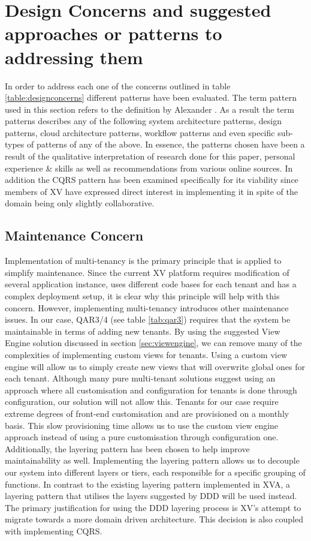 \section{Design Concerns and suggested approaches or patterns to addressing them}
In order to address each one of the concerns outlined in table \ref{table:designconcerns} different patterns have been evaluated. The term pattern used in this section refers to the definition by Alexander \cite{Alexander1977-ni}. As a result the term patterns describes any of the following system architecture patterns, design patterns, cloud architecture patterns, workflow patterns and even specific sub-types of patterns of any of the above. In essence, the patterns chosen have been a result of the qualitative interpretation of research done for this paper, personal experience \& skills as well as recommendations from various online sources. In addition the CQRS pattern has been examined specifically for its viability since members of XV have expressed direct interest in implementing it in spite of the domain being only slightly collaborative. 

\subsection{Maintenance Concern}
Implementation of multi-tenancy is the primary principle that is applied to simplify maintenance. Since the current XV platform requires modification of several application instance, uses different code bases for each tenant and has a complex deployment setup, it is clear why this principle will help with this concern. However, implementing multi-tenancy introduces other maintenance issues. In our case, QAR3/4 (see table \ref{tab:qar3}) requires that the system be maintainable in terms of adding new tenants. By using the suggested View Engine solution  discussed in section \ref{sec:viewengine}, we can remove many of the complexities of implementing custom views for tenants. Using a custom view engine will allow us to simply create new views that will overwrite global ones for each tenant. Although many pure multi-tenant solutions suggest using an approach where all customisation and configuration for tenants is done through configuration, our solution will not allow this. Tenants for our case require extreme degrees of front-end customisation and are provisioned on a monthly basis. This slow provisioning time allows us to use the custom view engine approach instead of using a pure customisation through configuration one. Additionally, the layering pattern has been chosen to help improve maintainability as well. Implementing the layering pattern allows us to decouple our system into different layers or tiers, each responsible for a specific grouping of functions. In contrast to the existing layering pattern implemented in XVA, a layering pattern that utilises the layers suggested by DDD will be used instead. The primary justification for using the DDD layering process is XV's attempt to migrate towards a more domain driven architecture. This decision is also coupled with implementing CQRS.


